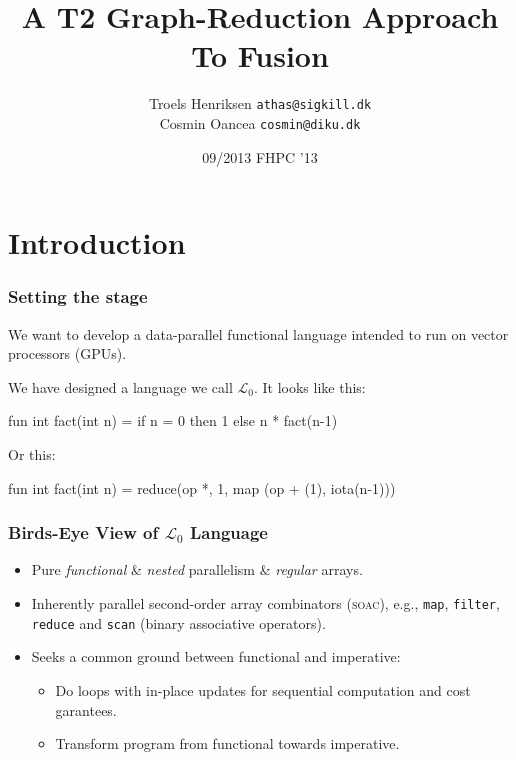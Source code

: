 \documentclass{beamer}
\title{A T2 Graph-Reduction Approach To Fusion}
\author[T.Henriksen,C.Oancea]{Troels Henriksen {\tt athas@sigkill.dk}\\Cosmin Oancea {\tt cosmin@diku.dk}}
\institute{Department of Computer Science (DIKU)\\University of Copenhagen}
\date[09/23]{09/2013 \textsc{FHPC} '13}
\newcommand{\LO}{$\mathcal{L}_0$}
\begin{document}
\titleslide


\section{Introduction}

\begin{frame}[fragile,t]
  \frametitle{Setting the stage}

  We want to develop a data-parallel functional language intended to
  run on vector processors (GPUs).

  \pause

  We have designed a language we call \LO{}.  It looks like this:

  \begin{colorcode}
    fun int fact(int n) =
      if n = 0 then 1 else n * fact(n-1)
  \end{colorcode}

\pause

  Or this:

  \begin{colorcode}
    fun int fact(int n) =
      reduce(op *, 1, map (op + (1), iota(n-1)))
  \end{colorcode}
\end{frame}

\begin{frame}
\frametitle{Birds-Eye View of \LO{} Language}

\begin{itemize}
\item Pure {\em functional} \& {\em nested} parallelism \& {\em regular} arrays.\bigskip
\item Inherently parallel second-order array combinators (\textsc{soac}),
  e.g., {\tt map}, {\tt filter}, {\tt reduce} and {\tt scan} (binary associative operators).\bigskip
\item Seeks a common ground between functional and imperative:\bigskip
\begin{itemize}
\item Do loops with in-place updates for sequential computation and cost garantees.\bigskip
\item Transform program from functional towards imperative.
\end{itemize}
\end{itemize}

\end{frame}
\end{document}
